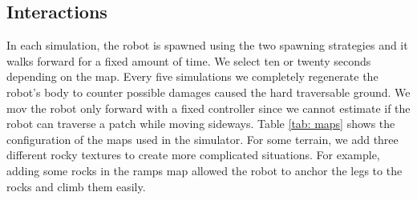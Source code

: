 \documentclass[../document.tex]{subfiles}
\begin{document}
\subsection{Interactions}
In each simulation, the robot is spawned using the two spawning strategies and it walks forward for a fixed amount of time. We select ten or twenty seconds depending on the map. Every five simulations we completely regenerate the robot's body to counter possible damages caused the hard traversable ground. We mov the robot only forward with a fixed controller since we cannot estimate if the robot can traverse a patch while moving sideways. Table \ref{tab: maps} shows the configuration of the maps used in the simulator. For some terrain, we add three different rocky textures to create more complicated situations. For example, adding some rocks in the ramps map allowed the robot to anchor the legs to the rocks and climb them easily.
\end{document}
